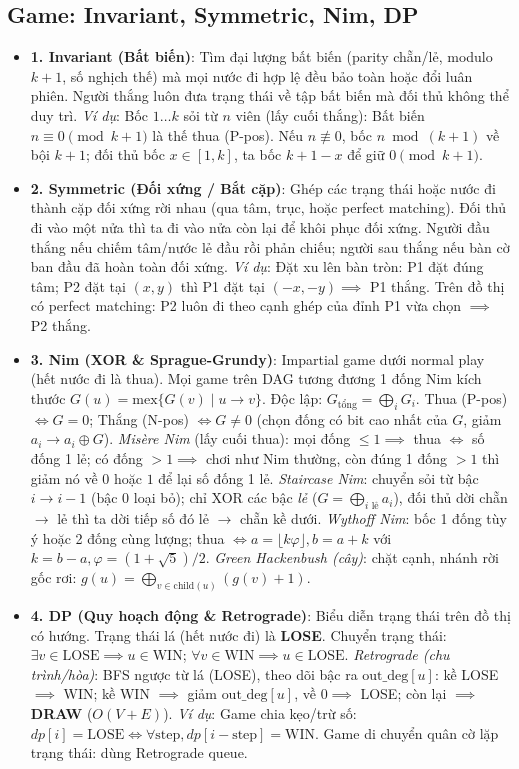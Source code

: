 \subsection{Game: Invariant, Symmetric, Nim, DP}
\begin{itemize}
    \setlength{\itemsep}{0pt}
    \setlength{\parsep}{0pt}
    \item \textbf{1. Invariant (Bất biến)}: Tìm đại lượng bất biến (parity chẵn/lẻ, modulo $k+1$, số nghịch thế) mà mọi nước đi hợp lệ đều bảo toàn hoặc đổi luân phiên. Người thắng luôn đưa trạng thái về tập bất biến mà đối thủ không thể duy trì. \textit{Ví dụ}: Bốc $1\dots k$ sỏi từ $n$ viên (lấy cuối thắng): Bất biến $n\equiv 0\pmod{k+1}$ là thế thua (P-pos). Nếu $n\not\equiv 0$, bốc $n\bmod(k+1)$ về bội $k+1$; đối thủ bốc $x\in[1,k]$, ta bốc $k+1-x$ để giữ $0\pmod{k+1}$.
    \item \textbf{2. Symmetric (Đối xứng / Bắt cặp)}: Ghép các trạng thái hoặc nước đi thành cặp đối xứng rời nhau (qua tâm, trục, hoặc perfect matching). Đối thủ đi vào một nửa thì ta đi vào nửa còn lại để khôi phục đối xứng. Người đầu thắng nếu chiếm tâm/nước lẻ đầu rồi phản chiếu; người sau thắng nếu bàn cờ ban đầu đã hoàn toàn đối xứng. \textit{Ví dụ}: Đặt xu lên bàn tròn: P1 đặt đúng tâm; P2 đặt tại $(x,y)$ thì P1 đặt tại $(-x,-y)\implies$ P1 thắng. Trên đồ thị có perfect matching: P2 luôn đi theo cạnh ghép của đỉnh P1 vừa chọn $\implies$ P2 thắng.
    \item \textbf{3. Nim (XOR \& Sprague-Grundy)}: Impartial game dưới normal play (hết nước đi là thua). Mọi game trên DAG tương đương 1 đống Nim kích thước $G(u)=\text{mex}\{G(v)\mid u\to v\}$. Độc lập: $G_{\text{tổng}}=\bigoplus_i G_i$. Thua (P-pos) $\iff G=0$; Thắng (N-pos) $\iff G\ne 0$ (chọn đống có bit cao nhất của $G$, giảm $a_i\to a_i\oplus G$).
    \emph{Mis\`ere Nim} (lấy cuối thua): mọi đống $\le1\implies$ thua $\iff$ số đống 1 lẻ; có đống $>1\implies$ chơi như Nim thường, còn đúng 1 đống $>1$ thì giảm nó về $0$ hoặc $1$ để lại số đống 1 lẻ.
    \emph{Staircase Nim}: chuyển sỏi từ bậc $i\to i-1$ (bậc 0 loại bỏ); chỉ XOR các bậc \emph{lẻ} ($G=\bigoplus_{i\text{ lẻ}} a_i$), đối thủ dời chẵn $\to$ lẻ thì ta dời tiếp số đó lẻ $\to$ chẵn kề dưới.
    \emph{Wythoff Nim}: bốc 1 đống tùy ý hoặc 2 đống cùng lượng; thua $\iff a=\lfloor k\varphi\rfloor, b=a+k$ với $k=b-a, \varphi=(1+\sqrt5)/2$.
    \emph{Green Hackenbush (cây)}: chặt cạnh, nhánh rời gốc rơi: $g(u)=\bigoplus_{v\in\text{child}(u)}(g(v)+1)$.
    \item \textbf{4. DP (Quy hoạch động \& Retrograde)}: Biểu diễn trạng thái trên đồ thị có hướng. Trạng thái lá (hết nước đi) là \textbf{LOSE}. Chuyển trạng thái: $\exists v\in\text{LOSE}\implies u\in\text{WIN}$; $\forall v\in\text{WIN}\implies u\in\text{LOSE}$.
    \emph{Retrograde (chu trình/hòa)}: BFS ngược từ lá (LOSE), theo dõi bậc ra $\text{out\_deg}[u]$: kề LOSE $\implies$ WIN; kề WIN $\implies$ giảm $\text{out\_deg}[u]$, về $0\implies$ LOSE; còn lại $\implies$ \textbf{DRAW} ($O(V+E)$). \textit{Ví dụ}: Game chia kẹo/trừ số: $dp[i]=\text{LOSE}\iff\forall\text{step}, dp[i-\text{step}]=\text{WIN}$. Game di chuyển quân cờ lặp trạng thái: dùng Retrograde queue.
\end{itemize}

